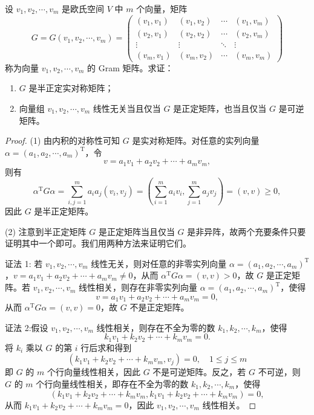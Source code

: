 \documentclass[lang=cn,12pt]{elegantbook}
\begin{document}
\begin{example}
设 \(v_1, v_2, \cdots, v_m\) 是欧氏空间 \(V\) 中 \(m\) 个向量，矩阵
\[
G = G(v_1, v_2, \cdots, v_m) =
\begin{pmatrix}
(v_1, v_1) & (v_1, v_2) & \cdots & (v_1, v_m) \\
(v_2, v_1) & (v_2, v_2) & \cdots & (v_2, v_m) \\
\vdots & \vdots & \ddots & \vdots \\
(v_m, v_1) & (v_m, v_2) & \cdots & (v_m, v_m)
\end{pmatrix}
\]
称为向量 \(v_1, v_2, \cdots, v_m\) 的 Gram 矩阵。求证：
\begin{enumerate}
    \item \(G\) 是半正定实对称矩阵；
    \item 向量组 \(v_1, v_2, \cdots, v_m\) 线性无关当且仅当 \(G\) 是正定矩阵，也当且仅当 \(G\) 是可逆矩阵。
\end{enumerate}
\end{example}

\begin{proof}
(1) 由内积的对称性可知 \(G\) 是实对称矩阵。对任意的实列向量 \(\alpha = (a_1, a_2, \cdots, a_m)^\mathrm{T}\)，令
\[
v = a_1v_1 + a_2v_2 + \cdots + a_mv_m,
\]
则有
\[
\alpha^\mathrm{T} G \alpha = \sum_{i,j=1}^m a_i a_j (v_i, v_j) = \left( \sum_{i=1}^m a_i v_i, \sum_{j=1}^m a_j v_j \right) = (v, v) \geq 0,
\]
因此 \(G\) 是半正定矩阵。

(2) 注意到半正定矩阵 \(G\) 是正定矩阵当且仅当 \(G\) 是非异阵，故两个充要条件只要证明其中一个即可。我们用两种方法来证明它们。

证法 1: 若 \(v_1, v_2, \cdots, v_m\) 线性无关，则对任意的非零实列向量 \(\alpha = (a_1, a_2, \cdots, a_m)^\mathrm{T}\)，\(v = a_1v_1 + a_2v_2 + \cdots + a_mv_m \neq 0\)，从而 \(\alpha^\mathrm{T} G \alpha = (v, v) > 0\)，故 \(G\) 是正定矩阵。若 \(v_1, v_2, \cdots, v_m\) 线性相关，则存在非零实列向量 \(\alpha = (a_1, a_2, \cdots, a_m)^\mathrm{T}\)，使得
\[
v = a_1v_1 + a_2v_2 + \cdots + a_mv_m = 0,
\]
从而 \(\alpha^\mathrm{T} G \alpha = (v, v) = 0\)，故 \(G\) 不是正定矩阵。

证法 2:假设 \(v_1, v_2, \cdots, v_m\) 线性相关，则存在不全为零的数 \(k_1, k_2, \cdots, k_m\)，使得
\[
k_1v_1 + k_2v_2 + \cdots + k_mv_m = 0.
\]
将 \(k_i\) 乘以 \(G\) 的第 \(i\) 行后求和得到
\[
(k_1v_1 + k_2v_2 + \cdots + k_mv_m, v_j) = 0, \quad 1 \leq j \leq m
\]
即 \(G\) 的 \(m\) 个行向量线性相关，因此 \(G\) 不是可逆矩阵。反之，若 \(G\) 不可逆，则 \(G\) 的 \(m\) 个行向量线性相关，即存在不全为零的数 \(k_1, k_2, \cdots, k_m\)，使得
\[
(k_1v_1 + k_2v_2 + \cdots + k_mv_m, k_1v_1 + k_2v_2 + \cdots + k_mv_m) = 0,
\]
从而 \(k_1v_1 + k_2v_2 + \cdots + k_mv_m = 0\)，因此 \(v_1, v_2, \cdots, v_m\) 线性相关。
\end{proof}
    
\end{document}
